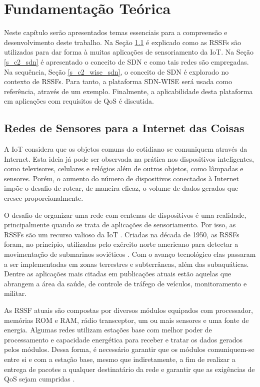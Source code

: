 
\chapter{Fundamentação Teórica}
\label{c_cap2}

Neste capítulo serão apresentados temas essenciais para a compreensão e desenvolvimento deste trabalho. Na Seção \ref{s_c2_IoT} é explicado como as \ac{RSSF}s são utilizadas para dar forma à muitas aplicações de sensoriamento da \ac{IoT}. Na Seção \ref{s_c2_sdn} é apresentado o conceito de \ac{SDN} e como tais redes são empregadas. Na sequência, Seção \ref{s_c2_wise_sdn},  o conceito de \ac{SDN} é explorado no contexto de \ac{RSSF}s. Para tanto, a  plataforma \ac{SDN-WISE} será usada como referência, através de um exemplo. Finalmente, a aplicabilidade desta plataforma em aplicações com requisitos de \ac{QoS} é discutida.

\section{Redes de Sensores para a Internet das Coisas}
\label{s_c2_IoT}

A \ac{IoT} considera que os objetos comuns do cotidiano se comuniquem através da Internet. Esta ideia já pode ser observada na prática nos dispositivos inteligentes, como televisores, celulares e relógios além de outros objetos, como lâmpadas e sensores. Porém, o aumento do número de dispositivos conectados à Internet impõe o desafio de rotear, de maneira eficaz, o volume de dados gerados que cresce proporcionalmente. 

O desafio de organizar uma rede com centenas de dispositivos é uma realidade, principalmente quando se trata de aplicações de sensoriamento. Por isso, as \ac{RSSF}s são um recurso valioso da \ac{IoT} \cite{Capella}. Criadas na década de 1950, as \ac{RSSF}s foram, no princípio, utilizadas pelo exército norte americano
para detectar a movimentação de submarinos soviéticos \cite{Nasir}. Com o avanço tecnológico elas passaram a ser implementadas em zonas terrestres e subterrâneas, além das subaquáticas. Dentre as aplicações mais citadas em publicações atuais estão aquelas que abrangem a área da saúde, de controle de tráfego de veículos, monitoramento e militar. 

As \ac{RSSF} atuais são compostas por diversos módulos equipados com processador, memórias \ac{ROM} e \ac{RAM}, rádio transceptor, um ou mais sensores e uma fonte de energia. Algumas redes utilizam estações base com melhor poder de processamento e capacidade energética para receber e tratar os dados gerados pelos módulos. Dessa forma, é necessário garantir que os módulos comuniquem-se entre si e com a estação base, mesmo que indiretamente, a fim de realizar a entrega de pacotes a qualquer destinatário da rede e garantir que as exigências de \ac{QoS} sejam cumpridas \cite{Guy}.

